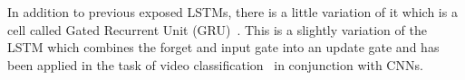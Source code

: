 In addition to previous exposed LSTMs, there is a little variation of it which is a cell called Gated Recurrent Unit (GRU)~\cite{cho2014learning}. This is a slightly variation of the LSTM which combines the forget and input gate into an update gate and has been applied in the task of video classification~\cite{ballas2015delving} in conjunction with CNNs.

